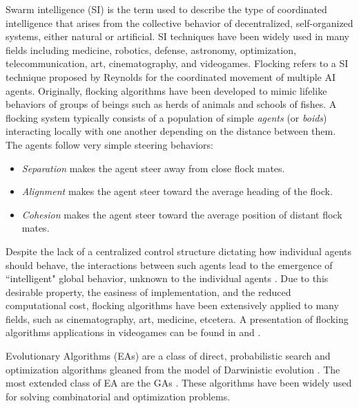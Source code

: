 \documentclass{llncs}
\begin{document}
Swarm intelligence (SI) \cite{BeniWang89} is the term used to describe the type of coordinated intelligence that arises from the collective behavior of decentralized, self-organized systems, either natural or artificial. SI techniques have been widely used in many fields including medicine, robotics, defense, astronomy, optimization, telecommunication, art, cinematography, and videogames. Flocking refers to a SI technique proposed by Reynolds \cite{Reynolds87} for the coordinated movement of multiple AI agents. Originally, flocking algorithms have been developed to mimic lifelike behaviors of groups of beings such as herds of animals and schools of fishes. A flocking system typically consists of a population of simple \textit{agents} (or \textit{boids}) interacting locally with one another depending on the distance between them. The agents follow very simple steering behaviors:

\begin{itemize}
	\item \textit{Separation} makes the agent steer away from close flock mates.
	\item \textit{Alignment} makes the agent steer toward the average heading of the flock.
	\item \textit{Cohesion} makes the agent steer toward the average position of distant flock mates.
\end{itemize} 

Despite the lack of a centralized control structure dictating how individual agents should behave, the interactions between such agents lead to the emergence of ``intelligent" global behavior, unknown to the individual agents \cite{SpectorEtAl03}. Due to this desirable property, the easiness of implementation, and the reduced computational cost, flocking algorithms have been extensively applied to many fields, such as cinematography, art, medicine, etcetera. A presentation of flocking algorithms applications in videogames can be found in \cite{Scutt02} and \cite{Rabin10}.

Evolutionary Algorithms (EAs) are a class of direct, probabilistic search and optimization algorithms gleaned from the model of Darwinistic evolution \cite{EAs_Back96}. The most extended class of EA are the GAs \cite{GAs_Goldberg89}. These algorithms have been widely used for solving combinatorial and optimization problems.
\end{document}
